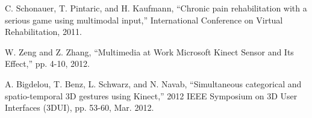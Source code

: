 \documentclass[journal]{IEEEtran}
\begin{document}
\begin{thebibliography}{1}
 C. Schonauer, T. Pintaric, and H. Kaufmann, “Chronic pain rehabilitation with a serious game using multimodal input,” International Conference on Virtual Rehabilitation, 2011.

 W. Zeng and Z. Zhang, “Multimedia at Work Microsoft Kinect Sensor and Its Effect,” pp. 4-10, 2012.

 A. Bigdelou, T. Benz, L. Schwarz, and N. Navab, “Simultaneous categorical and spatio-temporal 3D gestures using Kinect,” 2012 IEEE Symposium on 3D User Interfaces (3DUI), pp. 53-60, Mar. 2012.

\end{thebibliography}

% 










\end{document}
